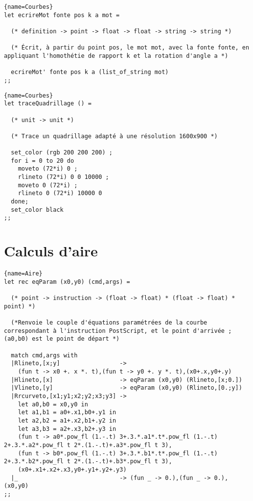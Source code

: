 \documentclass[10pt,twoside,a4paper]{article}
\begin{document}
\begin{lstlisting}{name=Courbes}
let ecrireMot fonte pos k a mot =

  (* definition -> point -> float -> float -> string -> string *)

  (* Écrit, à partir du point pos, le mot mot, avec la fonte fonte, en appliquant l'homothétie de rapport k et la rotation d'angle a *)
  
  ecrireMot' fonte pos k a (list_of_string mot)
;;
\end{lstlisting}
\pagebreak
\begin{lstlisting}{name=Courbes}
let traceQuadrillage () =

  (* unit -> unit *)

  (* Trace un quadrillage adapté à une résolution 1600x900 *)
  
  set_color (rgb 200 200 200) ;
  for i = 0 to 20 do
    moveto (72*i) 0 ;
    rlineto (72*i) 0 0 10000 ;
    moveto 0 (72*i) ;
    rlineto 0 (72*i) 10000 0
  done;
  set_color black
;;
\end{lstlisting}

\section{Calculs d'aire}%

\begin{lstlisting}{name=Aire}
let rec eqParam (x0,y0) (cmd,args) =

  (* point -> instruction -> (float -> float) * (float -> float) * point) *)
  
  (*Renvoie le couple d'équations paramétrées de la courbe correspondant à l'instruction PostScript, et le point d'arrivée ; (a0,b0) est le point de départ *)
  
  match cmd,args with
  |Rlineto,[x;y]                 ->
    (fun t -> x0 +. x *. t),(fun t -> y0 +. y *. t),(x0+.x,y0+.y)
  |Hlineto,[x]                   -> eqParam (x0,y0) (Rlineto,[x;0.])
  |Vlineto,[y]                   -> eqParam (x0,y0) (Rlineto,[0.;y])
  |Rrcurveto,[x1;y1;x2;y2;x3;y3] ->
    let a0,b0 = x0,y0 in
    let a1,b1 = a0+.x1,b0+.y1 in
    let a2,b2 = a1+.x2,b1+.y2 in
    let a3,b3 = a2+.x3,b2+.y3 in
    (fun t -> a0*.pow_fl (1.-.t) 3+.3.*.a1*.t*.pow_fl (1.-.t) 2+.3.*.a2*.pow_fl t 2*.(1.-.t)+.a3*.pow_fl t 3),
    (fun t -> b0*.pow_fl (1.-.t) 3+.3.*.b1*.t*.pow_fl (1.-.t) 2+.3.*.b2*.pow_fl t 2*.(1.-.t)+.b3*.pow_fl t 3),
    (x0+.x1+.x2+.x3,y0+.y1+.y2+.y3)
  |_                             -> (fun _ -> 0.),(fun _ -> 0.),(x0,y0)
;;
\end{lstlisting}
\end{document}
